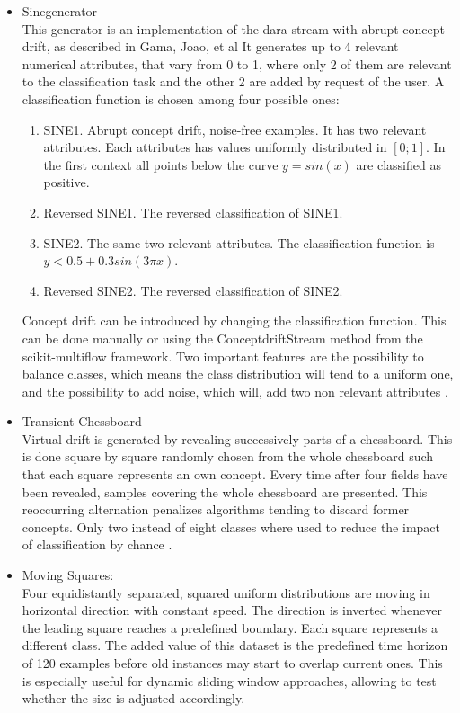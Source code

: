 \documentclass[12pt,oneside,a4paper,parskip]{scrbook}
\begin{document}
\begin{itemize}
  \item Sinegenerator\\
        This generator is an implementation of the dara stream with abrupt concept drift, as described in Gama, Joao, et al \cite{sinegenerator}
        It generates up to 4 relevant numerical attributes, that vary from 0 to 1, where only 2 of them are relevant to 
        the classification task and the other 2 are added by request of the user. A classification function is chosen 
        among four possible ones: 
        \begin{enumerate}
          \item SINE1. Abrupt concept drift, noise-free examples. It has two relevant attributes. Each attributes has 
          values uniformly distributed in $[0;1]$. In the first context all points below the curve $y=sin(x)$ are classified as positive.
          \item Reversed SINE1. The reversed classification of SINE1.
          \item SINE2. The same two relevant attributes. The classification function is $y<0.5+0.3sin(3\pi x)$.
          \item Reversed SINE2. The reversed classification of SINE2.
        \end{enumerate}

        Concept drift can be introduced by changing the classification function. This can be done manually or using the ConceptdriftStream method
        from the scikit-multiflow framework.
        Two important features are the possibility to balance classes, which means the class distribution will tend to a uniform one, and the 
        possibility to add noise, which will, add two non relevant attributes \cite{skmultiflow}.
    
  \item Transient Chessboard\\
        Virtual drift is generated by revealing successively parts of a chessboard. This is done square by square 
        randomly chosen from the whole chessboard such that each square represents an own concept. Every time after four 
        fields have been revealed, samples covering the whole chessboard are presented. This reoccurring alternation 
        penalizes algorithms tending to discard former concepts. Only two instead of eight classes where used to reduce
        the impact of classification by chance \cite{movingsquaresChessboardRialtobridge}.


  \item Moving Squares: \\
        Four equidistantly separated, squared uniform distributions are moving in horizontal direction with constant 
        speed. The direction is inverted whenever the leading square reaches a predefined boundary. Each square 
        represents a different class. The added value of this dataset is the predefined time horizon of 120 examples 
        before old instances may start to overlap current ones. This is especially useful for dynamic sliding window 
        approaches, allowing to test whether the size is adjusted accordingly. \cite{movingsquaresChessboardRialtobridge}
        


\end{itemize}
\end{document}
